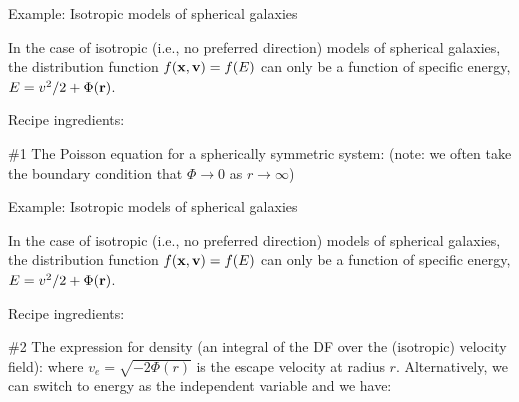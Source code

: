 \documentclass[letterpaper,landscape]{slides}
\begin{document}
\begin{slide}
\begin{center}
{\large \color{red} 
                  Example: Isotropic models of spherical galaxies  }
\end{center}

In the case of isotropic (i.e., no preferred direction) models of spherical
galaxies, the distribution function $f({\bf x}, {\bf v}) = f(E)$ can only be a
function of specific energy, $E = v^2 / 2 + \Phi({\bf r})$.

\hrulefill

Recipe ingredients:

\#1 The Poisson equation for a spherically symmetric system:
(note: we often take the boundary condition that $\Phi \rightarrow 0$ as $r \rightarrow \infty$)

\vfill
\end{slide}

\begin{slide}
\begin{center}
{\large \color{red} 
                  Example: Isotropic models of spherical galaxies  }
\end{center}

In the case of isotropic (i.e., no preferred direction) models of spherical
galaxies, the distribution function $f({\bf x}, {\bf v}) = f(E)$ can only be a
function of specific energy, $E = v^2 / 2 + \Phi({\bf r})$.

\hrulefill

Recipe ingredients:

\#2 The expression for density (an integral of the DF over the (isotropic) velocity field):
where $v_e = \sqrt{-2\Phi(r)}$ is the escape velocity at radius $r$. Alternatively, we can 
switch to energy as the independent variable and we have:

\vfill
\end{slide}
\end{document}
